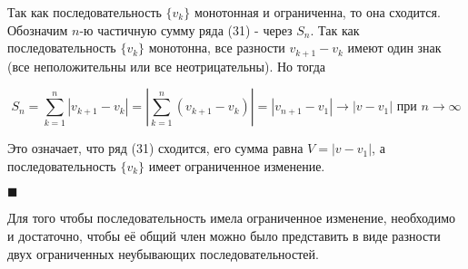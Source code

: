 Так как последовательность $\{v_k\}$ монотонная и ограниченна, то она сходится. Обозначим $n$-ю частичную сумму ряда (31)  - через $S_n$. Так как последовательность $\{v_k\}$ монотонна, все разности $v_{k + 1} - v_k$ имеют один знак (все неположительны или все неотрицательны). Но тогда

\begin{equation*}
	S_n = \displaystyle\sum_{k = 1}^n |v_{k + 1} - v_k| = \left| \displaystyle\sum_{k = 1}^n (v_{k + 1} - v_k) \right| = |v_{n + 1} - v_1| \rightarrow |v - v_1| \mbox{ при } n\rightarrow \infty
\end{equation*}

Это  означает, что ряд (31) сходится, его сумма равна $V = |v - v_1|$, а последовательность $\{v_k\}$ имеет ограниченное изменение.

\begin{flushright}
	$\blacksquare$
\end{flushright}

\begin{statm}
	Для того чтобы последовательность имела ограниченное изменение, необходимо и достаточно, чтобы её общий член можно было представить в виде разности двух ограниченных неубывающих последовательностей.
\end{statm}